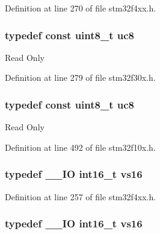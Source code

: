 Definition at line 270 of file stm32f4xx.\-h.

\hypertarget{group___exported__types_gac74022c74a461f810e0d4fdc9bfea480}{
\subsubsection[{uc8}]{\setlength{\rightskip}{0pt plus 5cm}typedef {\bf const} {\bf uint8\-\_\-t} {\bf uc8}}}\label{group___exported__types_gac74022c74a461f810e0d4fdc9bfea480}
Read Only 

Definition at line 279 of file stm32f30x.\-h.

\hypertarget{group___exported__types_gac74022c74a461f810e0d4fdc9bfea480}{
\subsubsection[{uc8}]{\setlength{\rightskip}{0pt plus 5cm}typedef {\bf const} {\bf uint8\-\_\-t} {\bf uc8}}}\label{group___exported__types_gac74022c74a461f810e0d4fdc9bfea480}
Read Only 

Definition at line 492 of file stm32f10x.\-h.

\hypertarget{group___exported__types_ga19c9450d60abff7c6d3d35f31c10f83e}{
\subsubsection[{vs16}]{\setlength{\rightskip}{0pt plus 5cm}typedef \-\_\-\-\_\-\-I\-O {\bf int16\-\_\-t} {\bf vs16}}}\label{group___exported__types_ga19c9450d60abff7c6d3d35f31c10f83e}


Definition at line 257 of file stm32f4xx.\-h.

\hypertarget{group___exported__types_ga19c9450d60abff7c6d3d35f31c10f83e}{
\subsubsection[{vs16}]{\setlength{\rightskip}{0pt plus 5cm}typedef \-\_\-\-\_\-\-I\-O {\bf int16\-\_\-t} {\bf vs16}}}\label{group___exported__types_ga19c9450d60abff7c6d3d35f31c10f83e}


